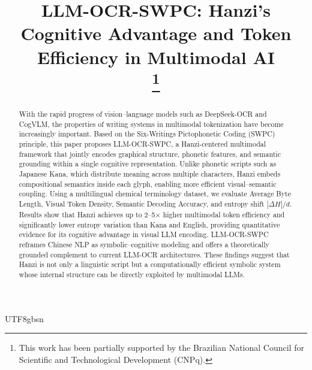 \documentclass[conference]{IEEEtran}
\begin{document}
\begin{CJK*}{UTF8}{gbsn}%

\title{LLM-OCR-SWPC: Hanzi’s Cognitive Advantage and Token Efficiency in Multimodal AI\\

\thanks{This work has been partially supported by the Brazilian National Council for Scientific and Technological Development (CNPq).}
}

\author{
\and



}


\maketitle

\begin{abstract}
With the rapid progress of vision–language models such as DeepSeek-OCR and CogVLM, the properties of writing systems in multimodal tokenization have become increasingly important. Based on the Six-Writings Pictophonetic Coding (SWPC) principle, this paper proposes LLM-OCR-SWPC, a Hanzi-centered multimodal framework that jointly encodes graphical structure, phonetic features, and semantic grounding within a single cognitive representation. Unlike phonetic scripts such as Japanese Kana, which distribute meaning across multiple characters, Hanzi embeds compositional semantics inside each glyph, enabling more efficient visual–semantic coupling. Using a multilingual chemical terminology dataset, we evaluate Average Byte Length, Visual Token Density, Semantic Decoding Accuracy, and entropy shift $|\Delta H|/d$. Results show that Hanzi achieves up to 2–5× higher multimodal token efficiency and significantly lower entropy variation than Kana and English, providing quantitative evidence for its cognitive advantage in visual LLM encoding. LLM-OCR-SWPC reframes Chinese NLP as symbolic–cognitive modeling and offers a theoretically grounded complement to current LLM-OCR architectures. These findings suggest that Hanzi is not only a linguistic script but a computationally efficient symbolic system whose internal structure can be directly exploited by multimodal LLMs.
\end{abstract}


\end{CJK*}
\end{document}
